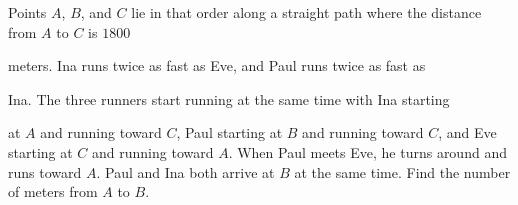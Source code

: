 Points $A$,  $B$,  and $C$ lie in that order along a straight path where the distance from $A$ to $C$ is $1800$

 meters. Ina runs twice as fast as Eve, and Paul runs twice as fast as 

Ina. The three runners start running at the same time with Ina starting 

at $A$ and running toward $C$,  Paul starting at $B$ and running toward $C$,  and Eve starting at $C$ and running toward $A$. When Paul meets Eve, he turns around and runs toward $A$. Paul and Ina both arrive at $B$ at the same time. Find the number of meters from $A$ to $B$.